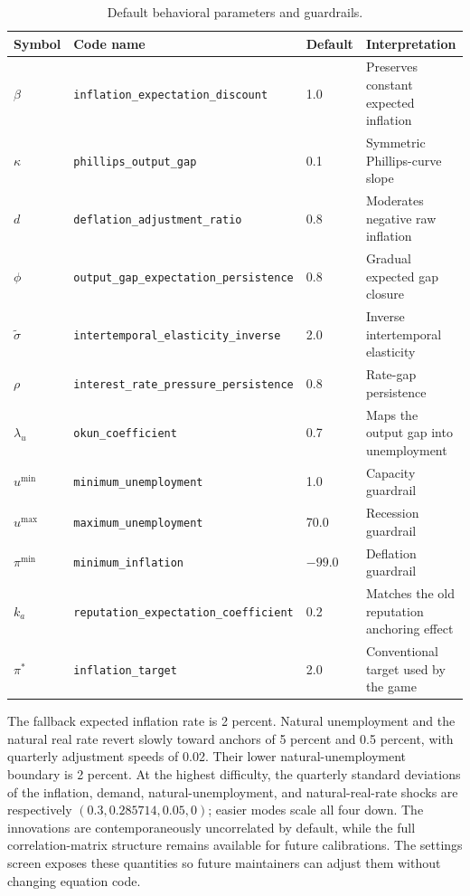 \documentclass[11pt]{article}
\newcommand{\pistar}{\pi^{*}}
\begin{document}
\begin{table}[h]
\centering
\begin{tabular}{@{}llll@{}}
\toprule
Symbol & Code name & Default & Interpretation \\
\midrule
$\beta$ & \texttt{inflation\_expectation\_discount} & 1.0 & Preserves constant expected inflation \\
$\kappa$ & \texttt{phillips\_output\_gap} & 0.1 & Symmetric Phillips-curve slope \\
$d$ & \texttt{deflation\_adjustment\_ratio} & 0.8 & Moderates negative raw inflation \\
$\phi$ & \texttt{output\_gap\_expectation\_persistence} & 0.8 & Gradual expected gap closure \\
$\widetilde\sigma$ & \texttt{intertemporal\_elasticity\_inverse} & 2.0 & Inverse intertemporal elasticity \\
$\rho$ & \texttt{interest\_rate\_pressure\_persistence} & 0.8 & Rate-gap persistence \\
$\lambda_u$ & \texttt{okun\_coefficient} & 0.7 & Maps the output gap into unemployment \\
$u^{\min}$ & \texttt{minimum\_unemployment} & 1.0 & Capacity guardrail \\
$u^{\max}$ & \texttt{maximum\_unemployment} & 70.0 & Recession guardrail \\
$\pi^{\min}$ & \texttt{minimum\_inflation} & $-99.0$ & Deflation guardrail \\
$k_a$ & \texttt{reputation\_expectation\_coefficient} & 0.2 & Matches the old reputation anchoring effect \\
$\pistar$ & \texttt{inflation\_target} & 2.0 & Conventional target used by the game \\
\bottomrule
\end{tabular}
\caption{Default behavioral parameters and guardrails.}
\label{tab:parameters}
\end{table}

The fallback expected inflation rate is 2 percent.  Natural unemployment and
the natural real rate revert slowly toward anchors of 5 percent and 0.5 percent,
with quarterly adjustment speeds of 0.02.  Their lower natural-unemployment
boundary is 2 percent.  At the highest difficulty, the quarterly standard
deviations of the inflation, demand, natural-unemployment, and natural-real-rate
shocks are respectively $(0.3,0.285714,0.05,0)$; easier modes scale all four down.
The innovations are contemporaneously uncorrelated by default, while the full
correlation-matrix structure remains available for future calibrations.
The settings screen exposes these quantities so future maintainers can adjust
them without changing equation code.
\end{document}
